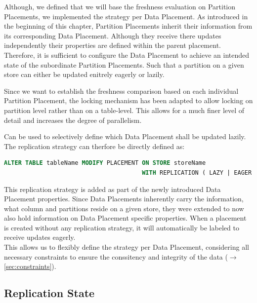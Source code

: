 Although, we defined that we will base the freshness evaluation on Partition Placements, we implemented the strategy per Data Placement. 
As introduced in the beginning of this chapter, Partition Placements inherit their information from its corresponding Data Placement.
Although they receive there updates independently their properties are defined within the parent placement. 
Therefore, it is sufficient to configure the Data Placement to achieve an intended state of the subordinate Partition Placements.
Such that a partition on a given store can either be updated enitrely eagerly or lazily. 


Since we want to establish the freshness comparison based on each individual Partition Placement, the locking mechanism
has been adapted to allow locking on partition level rather than on a table-level. 
This allows for a much finer level of detail and increases the degree of parallelism. 

Can be used to selectively define which Data Placement shall be updated lazily.
The replication strategy can therfore be directly defined as:
\begin{lstlisting}[language=sql, caption={SQL Statement Syntax to Modify the Designated Replication Strategy for a Data Placement.},label={lst:strategy}]
ALTER TABLE tableName MODIFY PLACEMENT ON STORE storeName 
                                       WITH REPLICATION ( LAZY | EAGER );
\end{lstlisting}

This replication strategy is added as part of the newly introduced Data Placement properties. Since Data Placements inherently carry the information, what column and partitions reside
on a given store, they were extended to now also hold information on Data Placement specific properties.
When a placement is created without any replication strategy, it will automatically be labeled to receive updates eagerly.\\
This allows us to flexibly define the strategy per Data Placement, considering all necessary constraints to ensure the conssitency and integrity of the data ($\rightarrow$ \ref{sec:constraints}).




\subsection{Replication State}
\label{sec:states}

